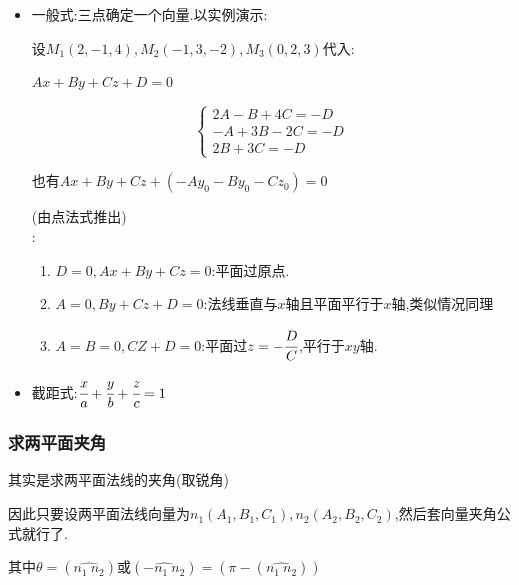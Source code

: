\documentclass[UTF8,12pt]{ctexbook}
\begin{document}
{{{{\begin{itemize}
{              设一点$M_0:(x_0,y_0,z_0)$,法线向量:$\vec{n} = (A,B,C)$

              设$M(x,y,z),\vec{M_0M}=(x - x_0,y - y_0,z - z_0),\vec{n} \cdot \vec{M_0M} = 0$

              平面的点法式方程为:$A(x - x_0) + B(y - y_0) + C(z - z_0) = 0$
              }
        \item {
              一般式:三点确定一个向量.以实例演示:

              设$M_1(2,-1,4),M_2(-1,3,-2),M_3(0,2,3)$代入:

              $Ax + By + Cz + D = 0$

              $$
                \begin{cases}
                  2A - B + 4C = -D \\
                  -A + 3B -2C = -D \\
                  2B + 3C = -D
                \end{cases}
              $$

              也有$Ax + By + Cz + (-Ay_0 - By_0 - Cz_0) = 0$

              (由点法式推出)\\

              :
              \begin{enumerate}
                \item $D = 0,Ax + By + Cz = 0$:平面过原点.
                \item $A = 0,By + Cz + D = 0$:法线垂直与$x$轴且平面平行于$x$轴,类似情况同理
                \item $A = B = 0,CZ + D = 0$:平面过$z = -\cfrac{D}{C}$,平行于$xy$轴.
              \end{enumerate}
              }
        \item 截距式:$\cfrac{x}{a} + \cfrac{y}{b} + \cfrac{z}{c} = 1$
      \end{itemize}
    }%

    \subsubsection{求两平面夹角}{
      其实是求两平面法线的夹角(取锐角)

      因此只要设两平面法线向量为$n_1(A_1,B_1,C_1),n_2(A_2,B_2,C_2)$,然后套向量夹角公式就行了.

      其中$\theta = (\widehat{n_1\ n_2})$或$(\widehat{-n_1\ n_2}) = (\pi - (\widehat{n_1\ n_2}))$

}}}}
\end{document}
